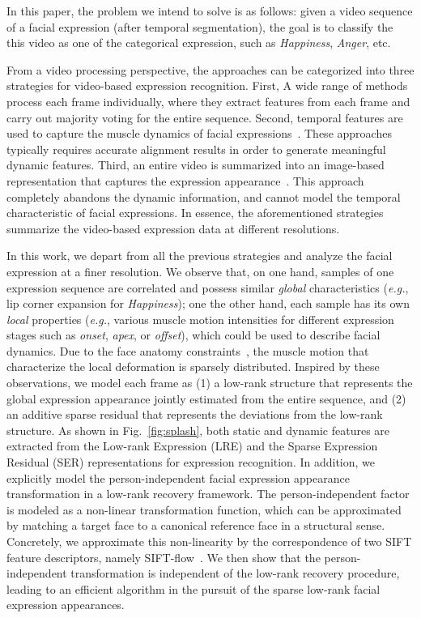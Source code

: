 \documentclass[journal]{IEEEtran}
\begin{document}
In this paper, the problem we intend to solve is as follows: given a video sequence of a facial expression (after temporal segmentation), the goal is to classify the this video as one of the categorical expression, such as \textit{Happiness}, \textit{Anger}, etc. 

From a video processing perspective, the approaches can be categorized into three strategies for video-based expression recognition. First, A wide range of methods~\cite{Bartlett_FG11}\cite{Valstar_SMCB12} process each frame individually, where they extract features from each frame and carry out majority voting for the entire sequence. Second, temporal features are used to capture the muscle dynamics of facial expressions~\cite{Zhao_PAMI07}\cite{Huang11}. These approaches typically requires accurate alignment results in order to generate meaningful dynamic features. Third, an entire video is summarized into an image-based representation that captures the expression appearance~\cite{Yang_SMCB12}\cite{Dahmane_TMM14}. This approach completely abandons the dynamic information, and cannot model the temporal characteristic of facial expressions. In essence, the aforementioned strategies summarize the video-based expression data at different resolutions. 

In this work, we depart from all the previous strategies and analyze the facial expression at a finer resolution. We observe that, on one hand, samples of one expression sequence are correlated and possess similar \textit{global} characteristics (\textit{e.g.}, lip corner expansion for \textit{Happiness}); one the other hand, each sample has its own \textit{local} properties (\textit{e.g.}, various muscle motion intensities for different expression stages such as \textit{onset}, \textit{apex}, or \textit{offset}), which could be used to describe facial dynamics. Due to the face anatomy constraints~\cite{Ekman78}, the muscle motion that characterize the local deformation is sparsely distributed. Inspired by these observations, we model each frame as (1) a low-rank structure that represents the global expression appearance jointly estimated from the entire sequence, and (2) an additive sparse residual that represents the deviations from the low-rank structure. As shown in Fig.~\ref{fig:splash}, both static and dynamic features are extracted from the Low-rank Expression (LRE) and the Sparse Expression Residual (SER) representations for expression recognition. In addition, we explicitly model the person-independent facial expression appearance transformation in a low-rank recovery framework. The person-independent factor is modeled as a non-linear transformation function, which can be approximated by matching a target face to a canonical reference face in a structural sense. Concretely, we approximate this non-linearity by the correspondence of two SIFT feature descriptors, namely SIFT-flow~\cite{Liu_PAMI11}. We then show that the person-independent transformation is independent of the low-rank recovery procedure, leading to an efficient algorithm in the pursuit of the sparse low-rank facial expression appearances. 
\end{document}

